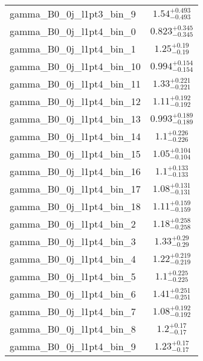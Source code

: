 \begin{tabular}{|l|c|}
gamma\_B0\_0j\_l1pt3\_bin\_9 & $1.54^{+0.493}_{-0.493}$ \\
gamma\_B0\_0j\_l1pt4\_bin\_0 & $0.823^{+0.345}_{-0.345}$ \\
gamma\_B0\_0j\_l1pt4\_bin\_1 & $1.25^{+0.19}_{-0.19}$ \\
gamma\_B0\_0j\_l1pt4\_bin\_10 & $0.994^{+0.154}_{-0.154}$ \\
gamma\_B0\_0j\_l1pt4\_bin\_11 & $1.33^{+0.221}_{-0.221}$ \\
gamma\_B0\_0j\_l1pt4\_bin\_12 & $1.11^{+0.192}_{-0.192}$ \\
gamma\_B0\_0j\_l1pt4\_bin\_13 & $0.993^{+0.189}_{-0.189}$ \\
gamma\_B0\_0j\_l1pt4\_bin\_14 & $1.1^{+0.226}_{-0.226}$ \\
gamma\_B0\_0j\_l1pt4\_bin\_15 & $1.05^{+0.104}_{-0.104}$ \\
gamma\_B0\_0j\_l1pt4\_bin\_16 & $1.1^{+0.133}_{-0.133}$ \\
gamma\_B0\_0j\_l1pt4\_bin\_17 & $1.08^{+0.131}_{-0.131}$ \\
gamma\_B0\_0j\_l1pt4\_bin\_18 & $1.11^{+0.159}_{-0.159}$ \\
gamma\_B0\_0j\_l1pt4\_bin\_2 & $1.18^{+0.258}_{-0.258}$ \\
gamma\_B0\_0j\_l1pt4\_bin\_3 & $1.33^{+0.29}_{-0.29}$ \\
gamma\_B0\_0j\_l1pt4\_bin\_4 & $1.22^{+0.219}_{-0.219}$ \\
gamma\_B0\_0j\_l1pt4\_bin\_5 & $1.1^{+0.225}_{-0.225}$ \\
gamma\_B0\_0j\_l1pt4\_bin\_6 & $1.41^{+0.251}_{-0.251}$ \\
gamma\_B0\_0j\_l1pt4\_bin\_7 & $1.08^{+0.192}_{-0.192}$ \\
gamma\_B0\_0j\_l1pt4\_bin\_8 & $1.2^{+0.17}_{-0.17}$ \\
gamma\_B0\_0j\_l1pt4\_bin\_9 & $1.23^{+0.17}_{-0.17}$ \\
\hline
\end{tabular}

